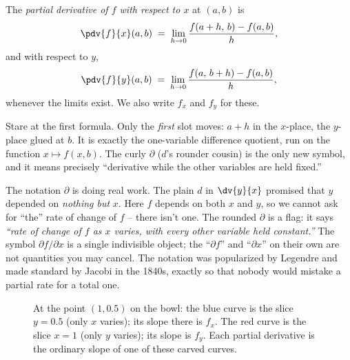 \begin{definition}
\label{ch32:def-partial}
The \emph{partial derivative of $f$ with respect to $x$} at $(a,b)$ is
\[
   \pdv{f}{x}(a,b) \;=\; \lim_{h\to 0} \frac{f(a+h,\,b) - f(a,b)}{h},
\]
and with respect to $y$,
\[
   \pdv{f}{y}(a,b) \;=\; \lim_{h\to 0} \frac{f(a,\,b+h) - f(a,b)}{h},
\]
whenever the limits exist. We also write $f_x$ and $f_y$ for these.
\end{definition}

Stare at the first formula. Only the \emph{first} slot moves: $a+h$ in the $x$-place, the
$y$-place glued at $b$. It is exactly the one-variable difference quotient, run on the
function $x \mapsto f(x,b)$. The curly $\partial$ ($d$'s rounder cousin) is the only new
symbol, and it means precisely ``derivative while the other variables are held fixed.''

\begin{happeningbox}
The notation $\partial$ is doing real work. The plain $d$ in $\dv{y}{x}$ promised that $y$
depended on \emph{nothing but} $x$. Here $f$ depends on both $x$ and $y$, so we cannot ask for
``the'' rate of change of $f$ -- there isn't one. The rounded $\partial$ is a flag: it says
\emph{``rate of change of $f$ as $x$ varies, with every other variable held constant.''} The
symbol $\partial f/\partial x$ is a single indivisible object; the ``$\partial f$'' and
``$\partial x$'' on their own are not quantities you may cancel. The notation was popularized
by Legendre and made standard by Jacobi in the 1840s, exactly so that nobody would mistake a
partial rate for a total one.
\end{happeningbox}

\begin{figure}[H]
\centering
{}
\caption{At the point $(1,0.5)$ on the bowl: the blue curve is the slice $y=0.5$ (only $x$
varies); its slope there is $f_x$. The red curve is the slice $x=1$ (only $y$ varies); its
slope is $f_y$. Each partial derivative is the ordinary slope of one of these carved curves.}
\label{ch32:fig-slices}
\end{figure}

